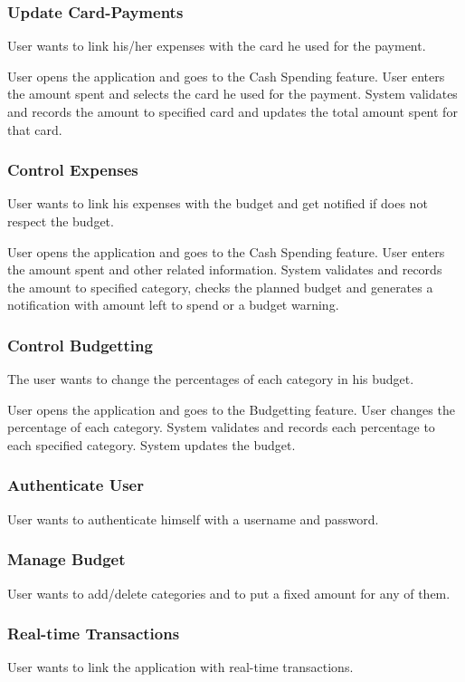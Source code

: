 \documentclass[12pt]{article}
\begin{document}
\subsubsection{Update Card-Payments}
User wants to link his/her expenses with the card he used for the payment.

User opens the application and goes to the Cash Spending feature. 
User enters the amount spent and selects the card he used for the payment.
System validates and records the amount to specified card and updates the total amount spent for that card.

\subsubsection{Control Expenses}
User wants to link his expenses with the budget and get notified if does not respect the budget.

User opens the application and goes to the Cash Spending feature. 
User enters the amount spent and other related information.
System validates and records the amount to specified category, checks the planned budget and generates a notification with amount left to spend or a budget warning.

\subsubsection{Control Budgetting}
The user wants to change the percentages of each category in his budget. 

User opens the application and goes to the Budgetting feature. 
User changes the percentage of each category.
System validates and records each percentage to each specified category.  
System updates the budget.

\subsubsection{Authenticate User}
User wants to authenticate himself with a username and password.

\subsubsection{Manage Budget}
User wants to add/delete categories and to put a fixed amount for any of them. 

\subsubsection{Real-time Transactions}
User wants to link the application with real-time transactions.
\end{document}
